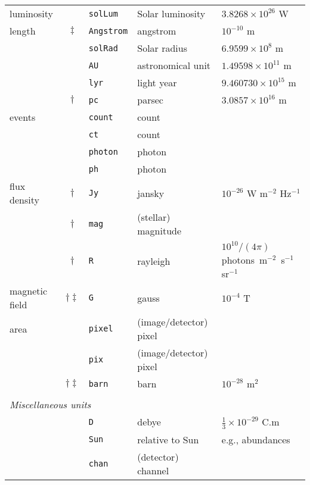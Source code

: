 \documentclass[onecolumn]{aa}
\begin{document}
\begin{table*}
\begin{center}
\begin{tabular}{lclll}
luminosity     &      & \verb+solLum+   & Solar luminosity
                      & $3.8268\times10^{26}$ W \\
length         &$\ddag$& \verb+Angstrom+ & angstrom 
                      & $10^{-10}$ m \\
               &      & \verb+solRad+   & Solar radius
                      & $6.9599\times10^8$ m \\
               &      & \verb+AU+       & astronomical unit 
                      & $1.49598\times10^{11}$ m \\
               &      & \verb+lyr+      & light year
                      & $9.460730\times10^{15}$ m \\
               &$\dag$& \verb+pc+& parsec
                      & $3.0857\times10^{16}$ m \\
events         &      & \verb+count+ & count  & \\
               &      & \verb+ct+    & count  & \\
               &      & \verb+photon+ & photon  & \\
               &      & \verb+ph+     & photon  & \\
flux density   &$\dag$& \verb+Jy+   & jansky
                      & $10^{-26}$ W m$^{-2}$ Hz$^{-1}$ \\
               &$\dag$& \verb+mag+   & (stellar) magnitude &  \\
               &$\dag$& \verb+R+     & rayleigh & $10^{10}/(4\pi)$ photons\, m$^{-2}$\, s$^{-1}$\, sr$^{-1}$ \\
magnetic field &$\dag\ddag$& \verb+G+     & gauss
                      & $10^{-4}$ T \\
area           &      & \verb+pixel+ & (image/detector) pixel & \\
               &      & \verb+pix+   & (image/detector) pixel & \\
               &$\dag\ddag$& \verb+barn+  & barn
                      & $10^{-28}$ m$^{2}$ \\
& & & & \\
\multicolumn{5}{l}{\it Miscellaneous units\rule[-2mm]{0mm}{5mm}}\\
               &      & \verb+D+     & debye
                      & $\frac{1}{3}\times 10^{-29}$ C.m \\
               &      & \verb+Sun+   & relative to Sun
                      & e.g., abundances \\
               &      & \verb+chan+  & (detector) channel & \\

\end{tabular}
\end{center}
\end{table*}
\end{document}

